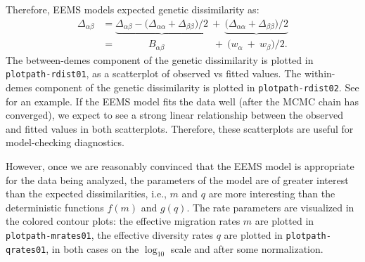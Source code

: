 \documentclass[a4paper,10pt,DIV=15,titlepage,mpinclude=true]{scrartcl}
\newcommand{\keystring}[1]{{\tt #1}}
\begin{document}
Therefore, EEMS models expected genetic dissimilarity as:
\begin{align}
\Delta_{\alpha\beta} & = \underbrace{\Delta_{\alpha\beta} - \big(\Delta_{\alpha\alpha}+\Delta_{\beta\beta}\big)/2} ~+~ \underbrace{\big(\Delta_{\alpha\alpha}+\Delta_{\beta\beta}\big)/2}\\
&= \phantom{\Delta_{\alpha\beta} -\big(}B_{\alpha\beta}\phantom{\big(+\Delta_{\beta\beta}\big)/2} ~+~ \big(w_\alpha ~+~ w_\beta\big)/2.
\end{align}
The between-demes component of the genetic dissimilarity is plotted in \keystring{plotpath-rdist01}, as a scatterplot of observed vs fitted values. The within-demes component of the genetic dissimilarity is plotted in \keystring{plotpath-rdist02}. See  for an example. If the EEMS model fits the data well (after the MCMC chain has converged), we expect to see a strong linear relationship between the observed and fitted values in both scatterplots. Therefore, these scatterplots are useful for model-checking diagnostics.

However, once we are reasonably convinced that the EEMS model is appropriate for the data being analyzed, the parameters of the model are of greater interest than the expected dissimilarities, i.e., $m$ and $q$ are more interesting than the deterministic functions $f(m)$ and $g(q)$. The rate parameters are visualized in the colored contour plots: the effective migration rates $m$ are plotted in \keystring{plotpath-mrates01}, the effective diversity rates $q$ are plotted in \keystring{plotpath-qrates01}, in both cases on the $\log_{10}$ scale and after some normalization. 
\end{document}
